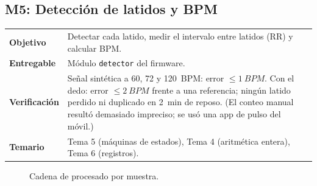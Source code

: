 \documentclass[11pt,a4paper]{article}
\newcommand{\modinfo}[4]{%
  \begin{center}\small
  \renewcommand{\arraystretch}{1.25}
  \begin{tabularx}{\textwidth}{>{\bfseries\color{navy}}lX}
  \toprule
  Objetivo     & #1 \\
  Entregable   & #2 \\
  Verificación & #3 \\
  Temario      & #4 \\
  \bottomrule
  \end{tabularx}
  \end{center}}
\begin{document}
\subsection{M5: Detección de latidos y BPM}

\modinfo{Detectar cada latido, medir el intervalo entre latidos (RR) y calcular BPM.}
{Módulo \texttt{detector} del firmware.}
{Señal sintética a 60, 72 y \qty{120}{BPM}: error $\le \qty{1}{BPM}$. Con el dedo: error
$\le \qty{2}{BPM}$ frente a una referencia; ningún latido perdido ni duplicado en
\qty{2}{min} de reposo. (El conteo manual resultó demasiado impreciso; se usó una app de
pulso del móvil.)}
{Tema 5 (máquinas de estados), Tema 4 (aritmética entera), Tema 6 (registros).}

\begin{figure}[H]
\centering
{}
\caption{Cadena de procesado por muestra.}
\label{fig:cadena}
\end{figure}
\end{document}
